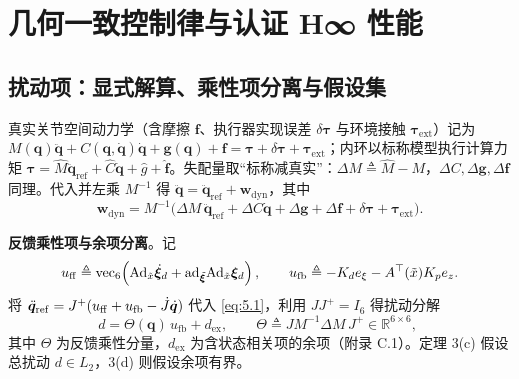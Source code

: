 \section{几何一致控制律与认证 H∞ 性能}

\subsection{扰动项：显式解算、乘性项分离与假设集}

真实关节空间动力学（含摩擦 $\boldsymbol f$、执行器实现误差 $\delta\boldsymbol\tau$ 与环境接触 $\boldsymbol\tau_{\mathrm{ext}}$）记为 $M(\boldsymbol q)\ddot{\boldsymbol q}+C(\boldsymbol q,\dot{\boldsymbol q})\dot{\boldsymbol q}+\boldsymbol g(\boldsymbol q)+\boldsymbol f=\boldsymbol\tau+\delta\boldsymbol\tau+\boldsymbol\tau_{\mathrm{ext}}$；内环以标称模型执行计算力矩 $\boldsymbol\tau=\hat M\ddot{\boldsymbol q}_{\mathrm{ref}}+\hat C\dot{\boldsymbol q}+\hat g+\hat{\boldsymbol f}$。失配量取“标称减真实”：$\Delta M\triangleq\hat M-M$，$\Delta C,\Delta\boldsymbol g,\Delta\boldsymbol f$ 同理。代入并左乘 $M^{-1}$ 得 $\ddot{\boldsymbol q}=\ddot{\boldsymbol q}_{\mathrm{ref}}+\boldsymbol w_{\mathrm{dyn}}$，其中
\begin{equation}
\boldsymbol w_{\mathrm{dyn}}=M^{-1}\bigl(\Delta M\,\ddot{\boldsymbol q}_{\mathrm{ref}}+\Delta C\dot{\boldsymbol q}+\Delta\boldsymbol g+\Delta\boldsymbol f+\delta\boldsymbol\tau+\boldsymbol\tau_{\mathrm{ext}}\bigr).
\tag{5.1}\label{eq:5.1}
\end{equation}

\textbf{反馈乘性项与余项分离}。记
\[
u_{\rm ff}\triangleq\mathrm{vec}_6\!\left(\mathrm{Ad}_{\tilde x}\dot{\boldsymbol\xi}_d+\mathrm{ad}_{\tilde{\boldsymbol\xi}}\mathrm{Ad}_{\tilde x}\boldsymbol\xi_d\right),\qquad
u_{\rm fb}\triangleq-K_de_\xi-A^{\top}(\tilde x)K_pe_z .
\]
将 $\ddot{\boldsymbol q}_{\mathrm{ref}}=J^{+}(u_{\rm ff}+u_{\rm fb}-\dot J\dot{\boldsymbol q})$ 代入 \eqref{eq:5.1}，利用 $JJ^{+}=I_6$ 得扰动分解
\begin{equation}
d=\Theta(\boldsymbol q)\,u_{\mathrm{fb}}+d_{\mathrm{ex}},\qquad
\Theta\triangleq J M^{-1}\Delta M\,J^{+}\in\mathbb R^{6\times6},\;
\tag{5.1d}\label{eq:5.1d}
\end{equation}
其中 $\Theta$ 为反馈乘性分量，$d_{\mathrm{ex}}$ 为含状态相关项的余项（附录 C.1）。定理 3(c) 假设总扰动 $d\in L_2$，3(d) 则假设余项有界。

